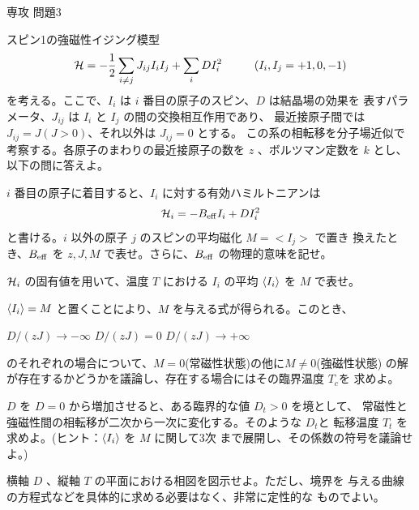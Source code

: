 \documentclass[fleqn]{jbook}
\begin{document}
\begin{question}{専攻 問題3}{}

スピン1の強磁性イジング模型
%
\[ {\cal H} = -\frac12 \sum_{i\neq j}J_{ij}I_iI_j + \sum_i DI_i^2%
    \hspace{10mm} (I_i,I_j=+1,0,-1) \]
%
を考える。ここで、$I_i$ は $i$ 番目の原子のスピン、$D$ は結晶場の効果を
表すパラメータ、$J_{ij}$ は $I_i$ と $I_j$ の間の交換相互作用であり、
最近接原子間では $J_{ij}=J(J>0)$、それ以外は $J_{ij}=0$ とする。
この系の相転移を分子場近似で考察する。各原子のまわりの最近接原子の数を
$z$ 、ボルツマン定数を $k$ とし、以下の問に答えよ。

\begin{subquestions}
\SubQuestion
  $i$ 番目の原子に着目すると、$I_i$ に対する有効ハミルトニアンは
  \[ {\cal H}_i = -B_{\rm eff} I_i + DI_i^2 \]
  と書ける。$i$ 以外の原子 $j$ のスピンの平均磁化 $M=<I_j>$ で置き
  換えたとき、$B_{\rm eff}$ を $z,J,M$ で表せ。さらに、$B_{\rm eff}$
  の物理的意味を記せ。

\SubQuestion
  ${\cal H}_i$ の固有値を用いて、温度 $T$ における $I_i$ の平均
  $\langle{I_i}\rangle$ を $M$ で表せ。

\SubQuestion
  $\langle{I_i}\rangle=M$ と置くことにより、$M$ を与える式が得られる。このとき、
  \begin{subsubquestions}
  \SubSubQuestion
    $D/(zJ) \rightarrow -\infty$
  \SubSubQuestion
    $D/(zJ) = 0$
  \SubSubQuestion
    $D/(zJ) \rightarrow +\infty$
  \end{subsubquestions}
  のそれぞれの場合について、$M=0$(常磁性状態)の他に$M\neq0$(強磁性状態)
  の解が存在するかどうかを議論し、存在する場合にはその臨界温度 $T_c$を
  求めよ。

\SubQuestion
  $D$ を $D=0$ から増加させると、ある臨界的な値 $D_t>0$ を境として、
  常磁性と強磁性間の相転移が二次から一次に変化する。そのような $D_t$と
  転移温度 $T_t$ を求めよ。(ヒント：$\langle{I_i}\rangle$ を $M$ に関して3次
  まで展開し、その係数の符号を議論せよ。)

\SubQuestion
  横軸 $D$ 、縦軸 $T$ の平面における相図を図示せよ。ただし、境界を
  与える曲線の方程式などを具体的に求める必要はなく、非常に定性的な
  ものでよい。

\end{subquestions}
\end{question}
\end{document}
